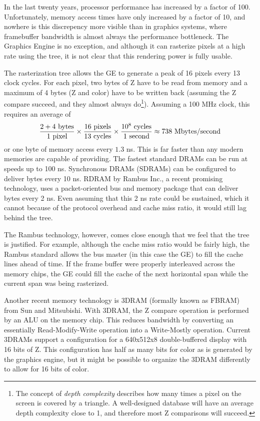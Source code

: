 \documentclass{book}
\begin{document}

In the last twenty years, processor performance has increased by a factor
of 100.  Unfortunately, memory access times have only increased by a
factor of 10, and nowhere is this discrepency more visible than in
graphics systems, where framebuffer bandwidth is almost always the
performance bottleneck.  The Graphics Engine is no exception, and although it
can rasterize pixels at a high rate using the tree, it is not clear that
this rendering power is fully usable.

The rasterization tree allows the GE to generate a peak of 16 pixels
every 13 clock cycles.  For each pixel, two bytes of Z have to be read
from memory and a maximum of 4 bytes (Z and color) have to be written
back (assuming the Z compare succeed, and they almost always
do\footnote{The concept of {\em depth complexity} describes how many
times a pixel on the screen is covered by a triangle.  A well-designed
database will have an average depth complexity close to 1, and
therefore most Z comparisons will succeed.}).  Assuming a 100 MHz
clock, this requires an average of
$${2 + 4 \mbox{ bytes} \over 1 \mbox{ pixel}} \times
  {16 \mbox{ pixels} \over 13 \mbox{ cycles}} \times
  {10^8 \mbox{ cycles} \over 1 \mbox{ second}} \approx 738 \mbox{ Mbytes/second}$$
or one byte of memory access every $1.3$ ns.  This is far faster than
any modern memories are capable of providing.  The fastest standard
DRAMs can be run at speeds up to 100 ns.  Synchronous DRAMs (SDRAMs) can
be configured to deliver bytes every 10 ns.  RDRAM\cite{rambus} by
Rambus Inc., a recent promising technology, uses a packet-oriented bus
and memory package that can deliver bytes every 2 ns.  Even assuming
that this 2 ns rate could be sustained, which it cannot because of the
protocol overhead and cache miss ratio, it would still lag behind the
tree.

The Rambus technology, however, comes close enough that we feel that the
tree is justified.  For example, although the cache miss ratio would be
fairly high, the Rambus standard allows the bus master (in this case the
GE) to fill the cache lines ahead of time.  If the frame buffer were
properly interleaved across the memory chips, the GE could fill the
cache of the next horizontal span while the current span was being
rasterized.

Another recent memory technology is 3DRAM\cite{fbram} (formally known
as FBRAM) from Sun and Mitsubishi.  With 3DRAM, the Z compare
operation is performed by an ALU on the memory chip.  This
reduces bandwidth by converting an essentially Read-Modify-Write
operation into a Write-Mostly operation.  Current 3DRAMs support a
configuration for a 640x512x8 double-buffered display with 16 bits of
Z.  This configuration has half as many bits for color as is generated
by the graphics engine, but it might be possible to organize the 3DRAM
differently to allow for 16 bits of color.
\end{document}
